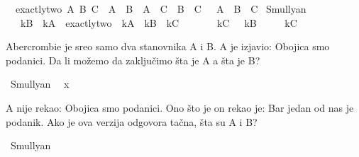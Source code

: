 \begin{isabellebody}
\begin{exercise}[subtitle=Logčki lavirinti.]
\ \ {\isachardoublequoteopen}exactly{\isacharunderscore}{\kern0pt}two\ A\ B\ C\ {\isasymlongleftrightarrow}\ {\isacharparenleft}{\kern0pt}{\isacharparenleft}{\kern0pt}A\ {\isasymand}\ B{\isacharparenright}{\kern0pt}\ {\isasymor}\ {\isacharparenleft}{\kern0pt}A\ {\isasymand}\ C{\isacharparenright}{\kern0pt}\ {\isasymor}\ {\isacharparenleft}{\kern0pt}B\ {\isasymand}\ C{\isacharparenright}{\kern0pt}{\isacharparenright}{\kern0pt}\ {\isasymand}\ {\isasymnot}\ {\isacharparenleft}{\kern0pt}A\ {\isasymand}\ B\ {\isasymand}\ C{\isacharparenright}{\kern0pt}{\isachardoublequoteclose}\isanewline
\isanewline
{}\isamarkupfalse%
\ Smullyan{\isacharunderscore}{\kern0pt}{}{\isacharunderscore}{\kern0pt}{}{\isacharcolon}{\kern0pt}\isanewline
\ \ \ {\isachardoublequoteopen}kB\ {\isasymlongleftrightarrow}\ {\isacharparenleft}{\kern0pt}kA\ {\isasymlongleftrightarrow}\ exactly{\isacharunderscore}{\kern0pt}two\ {\isacharparenleft}{\kern0pt}{\isasymnot}\ kA{\isacharparenright}{\kern0pt}\ {\isacharparenleft}{\kern0pt}{\isasymnot}\ kB{\isacharparenright}{\kern0pt}\ {\isacharparenleft}{\kern0pt}{\isasymnot}\ kC{\isacharparenright}{\kern0pt}{\isacharparenright}{\kern0pt}{\isachardoublequoteclose}\isanewline
\ \ \ \ \ \ \ {\isachardoublequoteopen}kC\ {\isasymlongleftrightarrow}\ {\isasymnot}\ kB{\isachardoublequoteclose}\isanewline
\ \ \ \ \ {\isachardoublequoteopen}kC{\isachardoublequoteclose}%
\isadelimproof
%
\endisadelimproof
%
\isatagproof
%
\endisatagproof
{\isafoldproof}%
%
\isadelimproof
%
\endisadelimproof
%
\begin{isamarkuptext}%
Abercrombie je sreo samo dva stanovnika A i B. 
      A je izjavio: Obojica smo podanici. 
      Da li možemo da zaključimo šta je A a šta je B?%
\end{isamarkuptext}\isamarkuptrue%
\isamarkupfalse%
\ Smullyan{\isacharunderscore}{\kern0pt}{}{\isacharunderscore}{\kern0pt}{}{\isacharcolon}{\kern0pt}\isanewline
\ \ {\isachardoublequoteopen}x{\isachardoublequoteclose}%
\isadelimproof
%
\endisadelimproof
%
\isatagproof
%
\endisatagproof
{\isafoldproof}%
%
\isadelimproof
%
\endisadelimproof
%
\begin{isamarkuptext}%
A nije rekao: Obojica smo podanici. 
      Ono što je on rekao je: Bar jedan od nas je podanik. 
      Ako je ova verzija odgovora tačna, šta su A i B?%
\end{isamarkuptext}\isamarkuptrue%
\isamarkupfalse%
\ Smullyan{\isacharunderscore}{\kern0pt}{}{\isacharunderscore}{\kern0pt}{}{\isacharcolon}{\kern0pt}\isanewline

\end{exercise}
\end{isabellebody}
